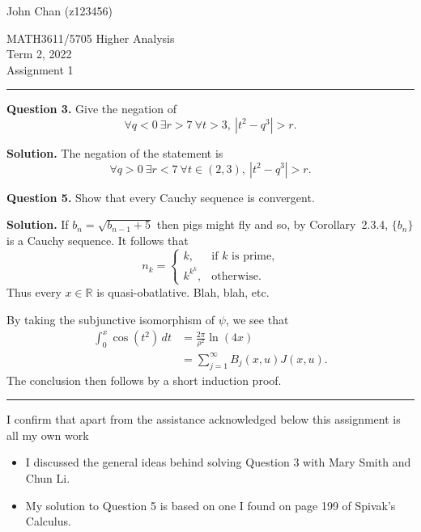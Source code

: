 \documentclass[12pt]{article}
\newcommand{\R}{{\mathbb{R}}}
\begin{document}
\hfill John Chan (z123456)


\begin{center}
 \begin{LARGE}MATH3611/5705 Higher Analysis\\[1ex]
             Term 2, 2022\\[1ex]
              Assignment 1
 \end{LARGE}
\end{center}


\bigskip \hrule \bigskip

\textbf{Question 3.} Give the negation of
   \[ \forall q< 0\ \exists r > 7\ \forall t > 3, \ |t^2 - q^3| > r.\]

\textbf{Solution.} The negation of the statement is
  \[ \forall q > 0\ \exists r < 7\ \forall t \in (2,3), \ |t^2 - q^3| > r. \]


\bigskip

\textbf{Question 5.} Show that every Cauchy sequence is convergent.

\medskip

\textbf{Solution.}
If $b_n = \sqrt{b_{n-1}+5}$ then pigs might fly and so, by Corollary~2.3.4, $\{b_n\}$ is a Cauchy sequence. It follows that
  \[ n_k = \begin{cases}
           k,   & \text{if $k$ is prime,} \\
           k^{k^k},  & \text{otherwise.}
           \end{cases}
   \]
Thus every $x \in \R$ is quasi-obatlative. Blah, blah, etc.

By taking the subjunctive isomorphism of $\psi$, we see that
  \begin{align*}
  \int_0^x \cos(t^2) \, dt 
     &= \frac{2\pi}{\rho^2} \ln(4x) \\
     &= \sum_{j=1}^\infty B_j(x,u) J(x,u).
  \end{align*}
The conclusion then follows by a short induction proof.
\bigskip

\hrule

\bigskip

I confirm that apart from the assistance acknowledged below this assignment is all my own work
\begin{itemize}
\item	I discussed the general ideas behind solving Question 3 with Mary Smith and Chun Li.
\item	My solution to Question 5 is based on one I found on page 199 of Spivak’s Calculus.
\end{itemize}
\end{document}
